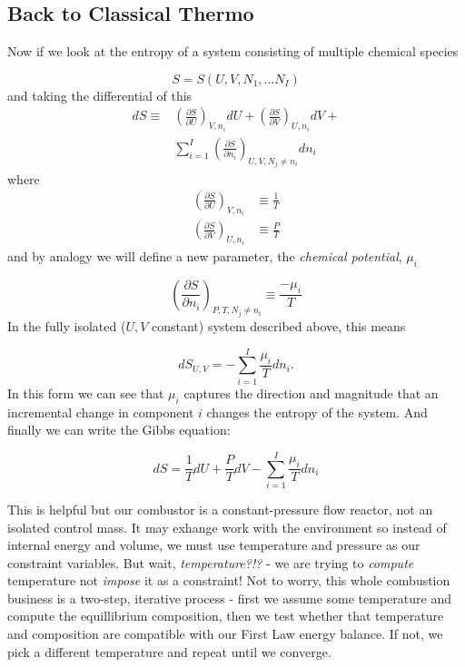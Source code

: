\documentclass[twocolumn]{memoir} %
\begin{document}
\subsection{Back to Classical Thermo}
Now if we look at the entropy of a system consisting of multiple chemical species

\begin{equation*}
    S = S(U, V, N_1,... N_I)
\end{equation*}
%
and taking the differential of this
%
\begin{equation*}
    \begin{split}
        dS \equiv &\left(\frac{\partial S}{\partial U}\right)_{V, n_i}dU + 
        \left(\frac{\partial S}{\partial V}\right)_{U, n_i}dV +\\
        & \sum \limits_{i=1}^I\left(\frac{\partial S}{\partial n_i}\right)_{U,V,N_j \neq n_i}dn_i
    \end{split}
\end{equation*}
%
where
\begin{equation*}
    \begin{split}
        \left(\frac{\partial S}{\partial U}\right)_{V, n_i}&\equiv \frac{1}{T}\\
        \left(\frac{\partial S}{\partial V}\right)_{U, n_i}&\equiv \frac{P}{T}
    \end{split}
\end{equation*}
%
and by analogy we will define a new parameter, the \emph{chemical potential}, $\mu_i$

\begin{equation*}
    \left(\frac{\partial S}{\partial n_i}\right)_{P,T,N_j \neq n_i} \equiv \frac{-\mu_i}{T}
    \label{eq:chem_pot}
\end{equation*}
%
In the fully isolated ($U, V$ constant) system described above, this means

\begin{equation*}
    dS_{U,V} = -\sum\limits_{i=1}^I\frac{\mu_i}{T}dn_i.
\end{equation*}
In this form we can see that $\mu_i$ captures the direction and magnitude that an 
incremental change in component $i$ changes the entropy of the system.  And finally we
can write the Gibbs equation:

\begin{equation}
    dS = \frac{1}{T}dU + \frac{P}{T}dV - \sum_{i=1}^I\frac{\mu_i}{T}dn_i
    \label{eq:gibbs}
\end{equation}

This is helpful but our combustor is a constant-pressure flow reactor, not an isolated
control mass.  It may exhange work 
with the environment so instead of internal energy
and volume, we must use temperature and pressure as our constraint variables.  But wait, 
\emph{temperature?!?} - we are trying to \emph{compute} temperature not \emph{impose} it 
as a constraint!  Not to worry, this whole combustion business is a two-step, iterative
process - first we assume some temperature and compute the equillibrium composition, then
we test whether that temperature and composition are compatible with our First Law energy
balance.  If not, we pick a different temperature and repeat until we converge.
\end{document}
